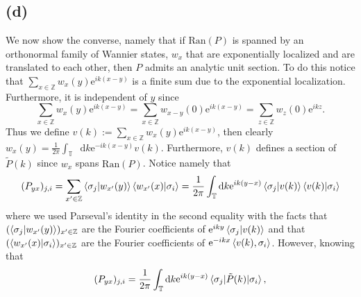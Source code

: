 \documentclass[a4paper,11pt]{article}
\newcommand{\euler}[1]{\text{e}^{#1}}
\newcommand{\Ran}[1]{\text{Ran}\left(#1\right)}
\newcommand*\diff{\mathop{}\!\mathrm{d}}
\newcommand{\Z}{\mathbb{Z}}
\numberwithin{equation}{section}
\begin{document}
 	 \subsection*{(d)}
 	 We now show the converse, namely that if $ \Ran{P} $ is spanned by an orthonormal family of Wannier states, $ w_x $ that are exponentially localized and are translated to each other, then $ P $ admits an analytic unit section.
 	 To do this notice that $ \sum_{x\in\Z} w_x(y)\euler{ik(x-y)} $ is a finite sum due to the exponential localization. Furthermore, it is independent of $ y $ since \begin{equation}
 	 \sum_{x\in\Z} w_x(y)\euler{ik(x-y)}=\sum_{x\in\Z} w_{x-y}(0)\euler{ik(x-y)}=\sum_{z\in\Z} w_z(0)\euler{ikz}.
 	 \end{equation}
	 Thus we define $ v(k):=\sum_{x\in\Z} w_x(y)\euler{ik(x-y)} $, then clearly $ w_x(y)=\frac{1}{2\pi}\int_{\mathbb{T}}\diff k\euler{-ik(x-y)}v(k) $. Furthermore, $ v(k) $ defines a section of $ \tilde{P}(k) $ since $ w_x$ spans $\Ran{P} $. Notice namely that
 	 \begin{equation}
 	 \begin{aligned}
 	 (P_{yx})_{j,i}=\sum_{x'\in\Z}\braket{\sigma_j|w_{x'}(y)}\braket{w_{x'}(x)|\sigma_i}=\frac{1}{2\pi}\int_{\mathbb{T}}\diff k\euler{ik(y-x)}\braket{\sigma_j|v(k)}\braket{v(k)|\sigma_i}
 	 \end{aligned}
 	 \end{equation}
 	 where we used Parseval's identity in the second equality with the facts that $ (\braket{\sigma_j|w_{x'}(y)})_{x'\in\Z} $ are the Fourier coefficients of $ \euler{iky}\braket{\sigma_j|v(k)} $ and that $ (\braket{w_{x'}(x)|\sigma_i})_{x'\in\Z} $ are the Fourier coefficients of $ \euler{-ikx}\braket{v(k),\sigma_i} $. However, knowing that \begin{equation}
 	 (P_{yx})_{j,i}=\frac{1}{2\pi}\int_{\mathbb{T}}\diff k\euler{ik(y-x)}\braket{\sigma_j|\tilde{P}(k)|\sigma_i},
 	 \end{equation}
\end{document}
